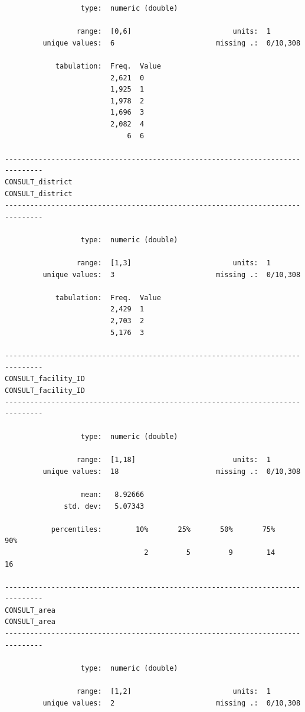 \documentclass[
  letterpaper,
  DIV=11,
  numbers=noendperiod]{scrreprt}
\begin{document}
\begin{verbatim}
                  type:  numeric (double)

                 range:  [0,6]                        units:  1
         unique values:  6                        missing .:  0/10,308

            tabulation:  Freq.  Value
                         2,621  0
                         1,925  1
                         1,978  2
                         1,696  3
                         2,082  4
                             6  6

-------------------------------------------------------------------------------
CONSULT_district                                               CONSULT_district
-------------------------------------------------------------------------------

                  type:  numeric (double)

                 range:  [1,3]                        units:  1
         unique values:  3                        missing .:  0/10,308

            tabulation:  Freq.  Value
                         2,429  1
                         2,703  2
                         5,176  3

-------------------------------------------------------------------------------
CONSULT_facility_ID                                         CONSULT_facility_ID
-------------------------------------------------------------------------------

                  type:  numeric (double)

                 range:  [1,18]                       units:  1
         unique values:  18                       missing .:  0/10,308

                  mean:   8.92666
              std. dev:   5.07343

           percentiles:        10%       25%       50%       75%       90%
                                 2         5         9        14        16

-------------------------------------------------------------------------------
CONSULT_area                                                       CONSULT_area
-------------------------------------------------------------------------------

                  type:  numeric (double)

                 range:  [1,2]                        units:  1
         unique values:  2                        missing .:  0/10,308


\end{verbatim}
\end{document}
